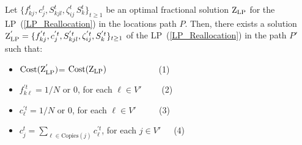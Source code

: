 \begin{lemma}\label{l:construction}
Let $\{f_{kj}^t, c_j^t, S_{kjl}^t,\zeta_{ij}^t\,  S_k^{t} \}_{t \geq 1}$  be an optimal fractional solution $\mathrm{Z}_{\mathrm{LP}}$
for the LP~(\ref{LP_Reallocation}) in the locations path $P$.
Then, there exists a solution $\mathrm{Z}_{\mathrm{LP}}^{'}=\{f_{k j}^{'t}, c_j^{'t}, S_{k j l}^{'t},\zeta_{ij}^{'t},S_k^{'t} 
\}_{t \geq 1}$
of the LP~(\ref{LP_Reallocation}) in the path $P'$ such that:
\begin{itemize}
    \item $\mathrm{Cost}(\mathrm{Z}_{\mathrm{LP}}^{'})$= $\mathrm{Cost}(\mathrm{Z}_{\mathrm{LP}})$ \,\,\, \, \,\,\,\, \, \,\,\,\, \, \,\, \,\, (1)

    \item $f^{'t}_{k\ell} = 1/N$ or $0$,  for each $\ell \in V'$ \,\,\, \, \, \,(2)

    \item $c^{'t}_{\ell} = 1/N$ or $0$,  for each $\ell \in V'$ \, \, \, \,\,  \,(3)
    
    \item $c^t_j = \sum\limits_{\ell \in \text{Copies}(j)}c^{'t}_{\ell}$,  for each $j \in 
    V'$ \, \, \,(4)
\end{itemize}
\end{lemma}
